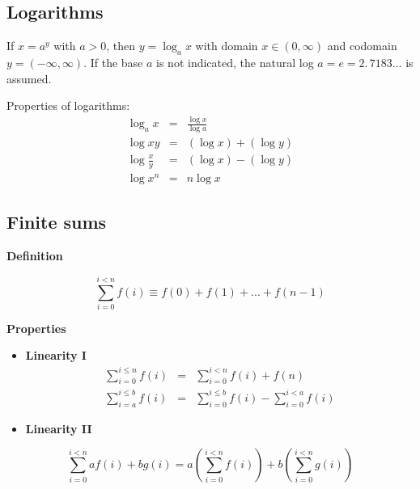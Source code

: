 \documentclass[justified, sixbynine]{tufte-book}
\def\subsubsection#1{{\bf #1}}
\theoremstyle{plain}%
\newtheorem * {corollary}{Corollary}
\theoremstyle{definition}
\theoremstyle{remark}
\newtheorem * {remark}{Remark}
\newtheorem * {note}{Note}
\begin{document}
\begin{fullwidth}
\goodbreak\subsection{Logarithms}

If $x=a^y$ with $a>0$, then $y=\log _ax$ with domain $x\in (0, \infty )$ and
codomain $y=(-\infty , \infty )$. If the base $a$ is not indicated, the
natural log $a=e=\allowbreak 2.\, 7183...$ is assumed.

Properties of logarithms:
\begin{eqnarray}
\log _ax &=&\frac{\log x}{\log a} \\
\log xy &=&(\log x)+(\log y) \\
\log \frac xy &=&(\log x)-(\log y) \\
\log x^n &=&n\log x
\end{eqnarray}

\goodbreak\subsection{Finite sums}

\subsubsection{Definition}

\begin{equation}
\sum_{i=0}^{i<n}f(i)\equiv f(0)+f(1)+...+f(n-1)
\end{equation}

\subsubsection{Properties}

\begin{itemize}
\item  {\bf Linearity I}
\begin{eqnarray}
\sum_{i=0}^{i\leq n}f(i) &=&\sum_{i=0}^{i<n}f(i)+f(n) \\
\sum_{i=a}^{i\leq b}f(i) &=&\sum_{i=0}^{i\leq b}f(i)-\sum_{i=0}^{i<a}f(i)
\end{eqnarray}

\item  {\bf Linearity II}
\end{itemize}

\begin{equation}
\sum_{i=0}^{i<n}af(i)+bg(i)=a\left( \sum_{i=0}^{i<n}f(i)\right) +b\left(
\sum_{i=0}^{i<n}g(i)\right)
\end{equation}


\end{fullwidth}
\end{document}
